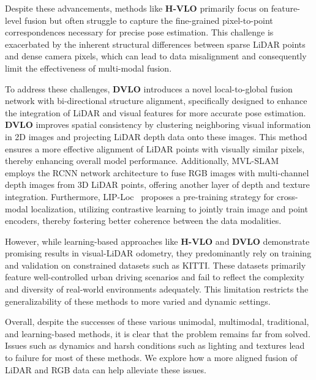 \documentclass[11pt,a4paper]{article}
\begin{document}
Despite these advancements, methods like \textbf{H-VLO} primarily focus on feature-level fusion but often struggle to capture the fine-grained pixel-to-point correspondences necessary for precise pose estimation. This challenge is exacerbated by the inherent structural differences between sparse LiDAR points and dense camera pixels, which can lead to data misalignment and consequently limit the effectiveness of multi-modal fusion.

To address these challenges, \textbf{DVLO} introduces a novel local-to-global fusion network with bi-directional structure alignment, specifically designed to enhance the integration of LiDAR and visual features for more accurate pose estimation. \textbf{DVLO} improves spatial consistency by clustering neighboring visual information in 2D images and projecting LiDAR depth data onto these images. This method ensures a more effective alignment of LiDAR points with visually similar pixels, thereby enhancing overall model performance.
Additionally, MVL-SLAM~\cite{an2022visual} employs the RCNN network architecture to fuse RGB images with multi-channel depth images from 3D LiDAR points, offering another layer of depth and texture integration. Furthermore, LIP-Loc~\cite{shubodh2024lip} proposes a pre-training strategy for cross-modal localization, utilizing contrastive learning to jointly train image and point encoders, thereby fostering better coherence between the data modalities.

However, while learning-based approaches like \textbf{H-VLO} and \textbf{DVLO} demonstrate promising results in visual-LiDAR odometry, they predominantly rely on training and validation on constrained datasets such as KITTI. These datasets primarily feature well-controlled urban driving scenarios and fail to reflect the complexity and diversity of real-world environments adequately. This limitation restricts the generalizability of these methods to more varied and dynamic settings.

Overall, despite the successes of these various unimodal, multimodal, traditional, and learning-based methods, it is clear that the problem remains far from solved. Issues such as dynamics and harsh conditions such as lighting and textures lead to failure for most of these methods. We explore how a more aligned fusion of LiDAR and RGB data can help alleviate these issues.

\end{document}
